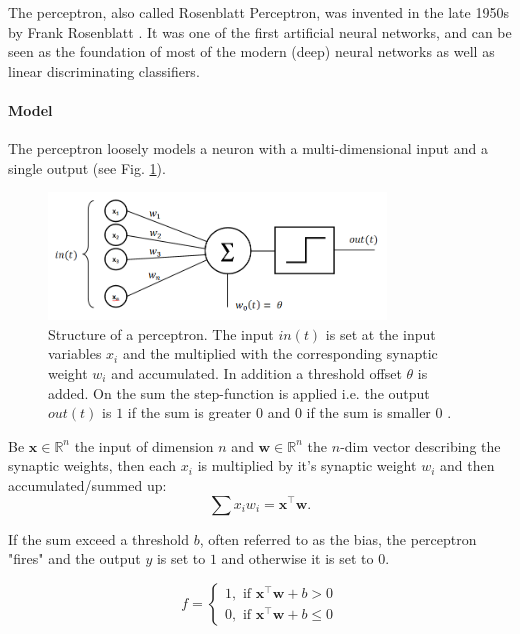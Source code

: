 The perceptron, also called Rosenblatt Perceptron, was invented in the late 1950s by Frank Rosenblatt \cite{rosenblatt1958perceptron}. 
It was one of the first artificial neural networks, and can be seen as the foundation of most of the modern (deep) neural networks as well as linear discriminating classifiers. 

\paragraph{Model} \label{c:permodel}

The perceptron loosely models a neuron with a multi-dimensional input and a single output (see Fig. \ref{fig:perceptron}). 

\begin{figure}
	\centering
    	\includegraphics[width=0.8\textwidth]{imgs/percept.png} 
    \caption{Structure of a perceptron. The input $in(t)$ is set at the input variables $x_i$ and the multiplied with the corresponding synaptic weight $w_i$ and accumulated. In addition a threshold offset $\theta$ is added. On the sum the step-function is applied i.e. the output $out(t)$ is $1$ if the sum is greater $0$ and $0$ if the sum is smaller $0$ \cite{perceptronImg}.}
	\label{fig:perceptron}
\end{figure}

Be $\textbf{x} \in \mathbb{R}^n$ the input of dimension $n$ and $\textbf{w}\in \mathbb{R}^n$ the $n$-dim vector describing the synaptic weights, then each $x_i$ is multiplied by it's synaptic weight $w_i$ and then accumulated/summed up:
\[
\sum x_i w_i = \textbf{x}^\intercal \textbf{w}.
\] 

If the sum exceed a threshold $b$, often referred to as the bias, the perceptron "fires" and the output $y$ is set to $1$ and otherwise it is set to $0$.

\[
	f = 
		\begin{cases}
			1, \text{  if  } \textbf{x}^\intercal \textbf{w} + b > 0  \\
			0, \text{  if  } \textbf{x}^\intercal \textbf{w} + b \le 0
		\end{cases}	
\]

